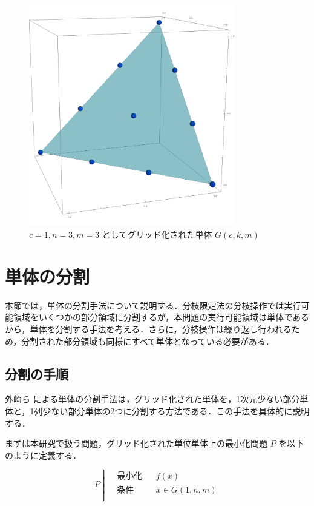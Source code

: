 \documentclass[a4paper,11pt]{jreport}
\begin{document}
\begin{figure}
\begin{center}
\includegraphics[width=9cm]{graphs/grid_simplex.png}
\caption{$ c=1, n=3, m=3 $ としてグリッド化された単体 $ G(c, k, m) $}
\label{fig:grid_simplex}
\end{center}
\end{figure}

\section{単体の分割} \label{sec:partition}

本節では，単体の分割手法について説明する．分枝限定法の分枝操作では実行可能領域をいくつかの部分領域に分割するが，本問題の実行可能領域は単体であるから，単体を分割する手法を考える．さらに，分枝操作は繰り返し行われるため，分割された部分領域も同様にすべて単体となっている必要がある．\par

\subsection{分割の手順}

外崎ら \cite{tonosaki} による単体の分割手法は，グリッド化された単体を，1次元少ない部分単体と，1列少ない部分単体の2つに分割する方法である．この手法を具体的に説明する．\par
まずは本研究で扱う問題，グリッド化された単位単体上の最小化問題 $ P $ を以下のように定義する．

$$
P \;
\left| \;
\begin{aligned}
& 最小化 && f(x) \\
& 条件 && x \in G(1, n, m) \\
\end{aligned}
\right.
$$
\end{document}
